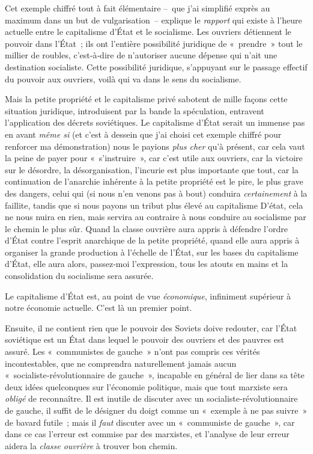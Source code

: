 \documentclass[french,twoside]{book} %
\begin{document}
Cet exemple chiffré tout à fait élémentaire – que j’ai simplifié exprès au maximum dans un but de vulgarisation – explique le \emph{rapport} qui existe à l’heure actuelle entre le capitalisme d’État et le socialisme. Les ouvriers détiennent le pouvoir dans l’État ; ils ont l’entière possibilité juridique de \hspace{1em}« prendre » tout le millier de roubles, c’est‑à‑dire de n’autoriser aucune dépense qui n’ait une destination socialiste. Cette possibilité juridique, s’appuyant sur le passage effectif du pouvoir aux ouvriers, voilà qui va dans le sens du socialisme.\par
Mais la petite propriété et le capitalisme privé sabotent de mille façons cette situation juridique, introduisent par la bande la spéculation, entravent l’application des décrets soviétiques. Le capitalisme d’État serait un immense pas en avant \emph{même si} (et c’est à dessein que j’ai choisi cet exemple chiffré pour renforcer ma démonstration) nous le payions \emph{plus cher} qu’à présent, car cela vaut la peine de payer pour « s’instruire », car c’est utile aux ouvriers, car la victoire sur le désordre, la désorganisation, l’incurie est plus importante que tout, car la continuation de l’anarchie inhérente à la petite propriété est le pire, le plus grave des dangers, celui qui (si nous n’en venons pas à bout) conduira \emph{certainement} à la faillite, tandis que si nous payons un tribut plus élevé au capitalisme D’état, cela ne nous nuira en rien, mais servira au contraire à nous conduire au socialisme par le chemin le plus sûr. Quand la classe ouvrière aura appris à défendre l’ordre d’État contre l’esprit anarchique de la petite propriété, quand elle aura appris à organiser la grande production à l’échelle de l’État, sur les bases du capitalisme d’État, elle aura alors, passez‑moi l’expression, tous les atouts en mains et la consolidation du socialisme sera assurée.\par
Le capitalisme d’État est, au point de vue \emph{économique}, infiniment supérieur à notre économie actuelle. C'est là un premier point.\par
Ensuite, il ne contient rien que le pouvoir des Soviets doive redouter, car l’État soviétique est un État dans lequel le pouvoir des ouvriers et des pauvres est assuré. Les « communistes de gauche » n’ont pas compris ces vérités incontestables, que ne comprendra naturellement jamais aucun \hspace{1em}« socialiste‑révolutionnaire de gauche », incapable en général de lier dans sa tête deux idées quelconques sur l’économie politique, mais que tout marxiste sera \emph{obligé} de reconnaître. Il est inutile de discuter avec un socialiste‑révolutionnaire de gauche, il suffit de le désigner du doigt comme un \hspace{1em}« exemple à ne pas suivre » de bavard futile ; mais il \emph{faut} discuter avec un « communiste de gauche », car dans ce cas l’erreur est commise par des marxistes, et l’analyse de leur erreur aidera la \emph{classe ouvrière} à trouver bon chemin.\par
\end{document}
